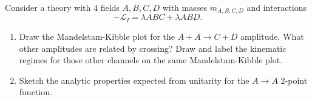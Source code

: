 \documentclass[12pt]{article}
\begin{document}
\begin{enumerate}
Consider a theory with 4 fields $A,B,C,D$ with masses $m_{A,B,C,D}$ and interactions
\[ -\mathcal{L}_I =  \lambda ABC +\lambda A BD.\] 

\begin{enumerate}
\item Draw the Mandelstam-Kibble plot for the $A+A\to C+D$ amplitude. What other amplitudes are related by crossing? Draw and label the kinematic regimes for those other channels on the same Mandelstam-Kibble plot.

\item Sketch the analytic properties expected from unitarity for the $A\to A$ 2-point function.
\end{enumerate}


%
%
%
%
%
%



\end{enumerate}
 
\end{document}
